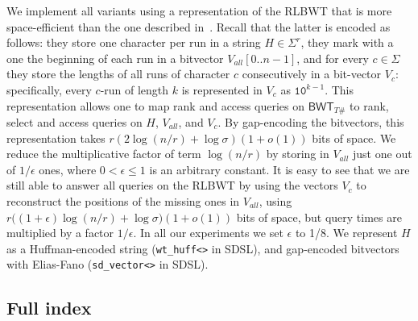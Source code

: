 \documentclass[a4paper,UKenglish]{lipics-v2016}
\newcommand{\BWT}{\ensuremath{\mathsf{BWT}}}
\newcommand{\runs}{r}
\begin{document}
We implement all variants using a representation of the RLBWT that is more space-efficient than the one described in~\cite{SirenVMN08}. Recall that the latter is encoded as follows: they store one character per run in a string $H \in \Sigma^\runs$, they mark with a one the beginning of each run in a bitvector $V_{all}[0..n-1]$, and for every $c \in \Sigma$ they store the lengths of all runs of character $c$ consecutively in a bit-vector $V_c$: specifically, every $c$-run of length $k$ is represented in $V_c$ as $\mathtt{10}^{k-1}$. 
This representation allows one to map rank and access queries on $\BWT_{T\#}$ to rank, select and access queries on $H$, $V_{all}$, and $V_c$. By gap-encoding the bitvectors, this representation takes $\runs(2\log(n/\runs)+\log{\sigma})(1+o(1))$ bits of space. We reduce the multiplicative factor of term $\log(n/\runs)$ by storing in $V_{all}$ just one out of $1/\epsilon$ ones, where $0<\epsilon\leq 1$ is an arbitrary constant. It is easy to see that we are still able to answer all queries on the RLBWT by using the vectors $V_c$ to reconstruct the positions of the missing ones in $V_{all}$, using $\runs\big((1+\epsilon)\log(n/\runs)+\log{\sigma}\big)(1+o(1))$ bits of space, but query times are multiplied by a factor $1/\epsilon$. In all our experiments we set $\epsilon$ to 1/8. We represent $H$ as a Huffman-encoded string (\texttt{wt\_huff<>} in SDSL), and gap-encoded bitvectors with Elias-Fano (\texttt{sd\_vector<>} in SDSL).











































\subsection{Full index}
\end{document}
